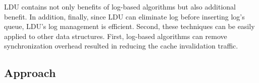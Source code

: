 LDU contains not only benefits of log-based algorithms but also additional benefit.
In addition, finally, since LDU can eliminate log before inserting log's queue,
LDU's log management is efficient.
Second, these techniques can be easily applied to other data structures.
First, log-based algorithms can remove synchronization overhead resulted in
reducing the cache invalidation traffic.
\fi


\subsection{Approach}


\ifkor
\else
\fi

